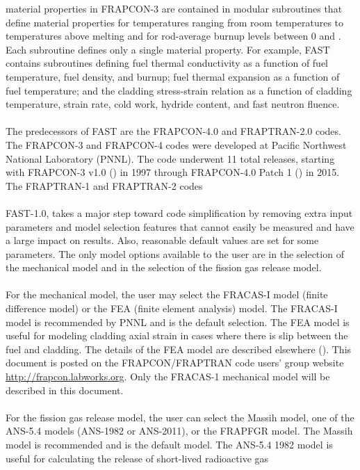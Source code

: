 material properties in FRAPCON-3 are contained in modular subroutines that define material
properties for temperatures ranging from room temperatures to temperatures above melting and for
rod-average burnup levels between 0 and . Each subroutine defines only a single
material property. For example, FAST contains subroutines defining fuel thermal conductivity as a
function of fuel temperature, fuel density, and burnup; fuel thermal expansion as a function of fuel
temperature; and the cladding stress-strain relation as a function of cladding temperature, strain
rate, cold work, hydride content, and fast neutron fluence.
\\
\\
The predecessors of FAST are the FRAPCON-4.0 and FRAPTRAN-2.0 codes.  The FRAPCON-3 and FRAPCON-4
codes were developed at Pacific Northwest National Laboratory (PNNL). The code underwent 11 total
releases, starting with FRAPCON-3 v1.0 (\cite{ref:Berna1997}) in 1997 through
FRAPCON-4.0 Patch 1 (\cite{ref:Geelhood2015a}) in 2015. The FRAPTRAN-1 and
FRAPTRAN-2 codes
\\
\\
FAST-1.0, takes a major step toward code simplification by removing extra input parameters and model
selection features that cannot easily be measured and have a large impact on results. Also,
reasonable default values are set for some parameters. The only model options available to the user
are in the selection of the mechanical model and in the selection of the fission gas release model.
\\
\\
For the mechanical model, the user may select the FRACAS-I model (finite difference model) or the
FEA (finite element analysis) model. The FRACAS-I model is recommended by PNNL and is the default
selection. The FEA model is useful for modeling cladding axial strain in cases where there is slip
between the fuel and cladding. The details of the FEA model are described elsewhere
(\cite{ref:Knuutila2006a}). This document is posted on the FRAPCON/FRAPTRAN code users'
group website \url{http://frapcon.labworks.org}. Only the FRACAS-1 mechanical model will be
described in this document.
\\
\\
For the fission gas release model, the user can select the Massih model, one of the ANS-5.4 models
(ANS-1982 or ANS-2011), or the FRAPFGR model. The Massih model is recommended and is the default
model. The ANS-5.4 1982 model is useful for calculating the release of short-lived radioactive gas
